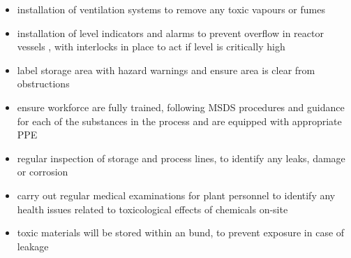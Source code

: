 \begin{itemize}
    \item installation of ventilation systems to remove any toxic vapours or fumes 
    \item installation of level indicators and alarms to prevent overflow in reactor vessels , with interlocks in place to act if level is critically high
    \item label storage area with hazard warnings and ensure area is clear from obstructions
    \item ensure workforce are fully trained, following MSDS procedures and guidance for each of the substances in the process and are equipped with appropriate PPE 
    \item regular inspection of storage and process lines, to identify any leaks, damage or corrosion 
    \item carry out regular medical examinations for plant personnel to identify any health issues related to toxicological effects of chemicals on-site
\item toxic materials will be stored within an bund, to prevent exposure in case of leakage 
\end{itemize}



